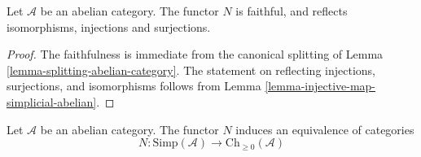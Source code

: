 \begin{lemma}
\label{lemma-N-faithful}
Let $\mathcal{A}$ be an abelian category.
The functor $N$ is faithful, and reflects
isomorphisms, injections and surjections.
\end{lemma}

\begin{proof}
The faithfulness is immediate from the canonical
splitting of Lemma \ref{lemma-splitting-abelian-category}.
The statement on reflecting injections, surjections, and
isomorphisms follows from
Lemma \ref{lemma-injective-map-simplicial-abelian}.
\end{proof}

\begin{theorem}
\label{theorem-dold-kan}
Let $\mathcal{A}$ be an abelian category.
The functor $N$ induces an equivalence of
categories
$$
N :
\text{Simp}(\mathcal{A})
\longrightarrow
\text{Ch}_{\geq 0}(\mathcal{A})
$$
\end{theorem}

